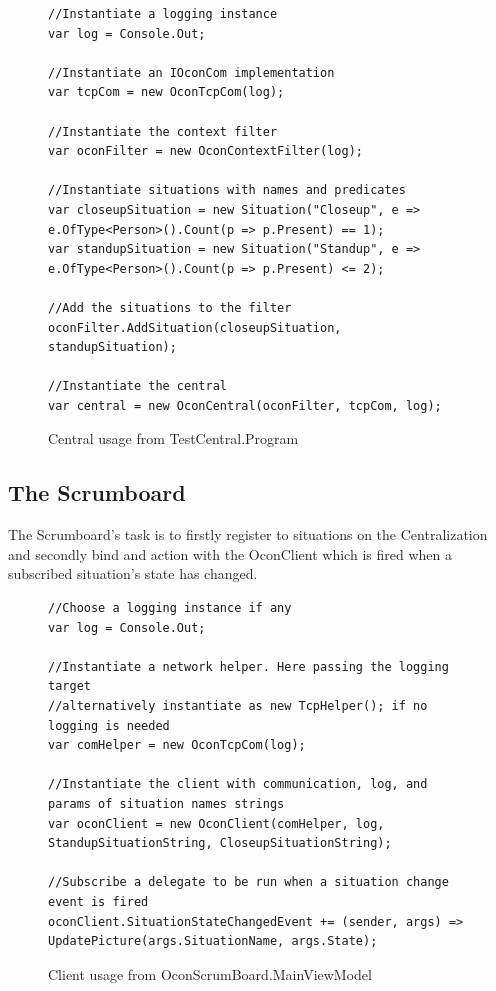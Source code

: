 \documentclass[../report.tex]{subfiles}
\begin{document}
\begin{figure}[H]
\begin{lstlisting}
//Instantiate a logging instance
var log = Console.Out;

//Instantiate an IOconCom implementation
var tcpCom = new OconTcpCom(log);

//Instantiate the context filter
var oconFilter = new OconContextFilter(log);

//Instantiate situations with names and predicates
var closeupSituation = new Situation("Closeup", e => e.OfType<Person>().Count(p => p.Present) == 1);
var standupSituation = new Situation("Standup", e => e.OfType<Person>().Count(p => p.Present) <= 2);

//Add the situations to the filter
oconFilter.AddSituation(closeupSituation, standupSituation);

//Instantiate the central
var central = new OconCentral(oconFilter, tcpCom, log);
\end{lstlisting}
\caption{Central usage from TestCentral.Program}
\label{code:OconCentral}
\end{figure}


\newpage

\subsection{The Scrumboard}

The Scrumboard's task is to firstly register to situations on the Centralization and secondly bind and action with the OconClient which is fired when a subscribed situation's state has changed.

\begin{figure}[H]
\begin{lstlisting}
//Choose a logging instance if any
var log = Console.Out;

//Instantiate a network helper. Here passing the logging target
//alternatively instantiate as new TcpHelper(); if no logging is needed
var comHelper = new OconTcpCom(log);

//Instantiate the client with communication, log, and params of situation names strings
var oconClient = new OconClient(comHelper, log, StandupSituationString, CloseupSituationString);

//Subscribe a delegate to be run when a situation change event is fired
oconClient.SituationStateChangedEvent += (sender, args) => UpdatePicture(args.SituationName, args.State);
\end{lstlisting}
\caption{Client usage from OconScrumBoard.MainViewModel}
\label{code:OconClient}
\end{figure}
\end{document}
